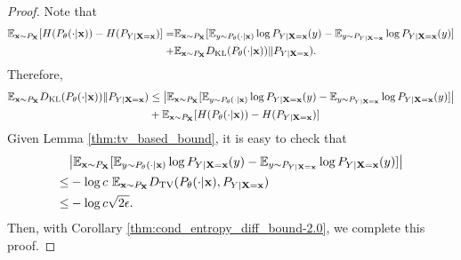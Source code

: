 \begin{proof}
Note that
\begin{equation*}
\begin{split}
    \mathbb{E}_{\mathbf{x}\sim P_{\mathbf{X}}} [ H( P_{\theta}(\cdot|\mathbf{x})) - H(P_{Y|\mathbf{X}=\mathbf{x}})] = & \mathbb{E}_{\mathbf{x}\sim P_{\mathbf{X}}} [\mathbb{E}_{y\sim P_{\theta}(\cdot|\mathbf{x})}\log P_{Y|\mathbf{X}=\mathbf{x}}(y) -\mathbb{E}_{y\sim P_{Y|\mathbf{X}=\mathbf{x}}} \log P_{Y|\mathbf{X}=\mathbf{x}}(y) ] \\ 
    +& {\mathbb{E}_{\mathbf{x}\sim P_{\mathbf{X}}} D_{\rm KL}(P_{\theta}(\cdot|\mathbf{x}))} \| P_{Y|\mathbf{X}=\mathbf{x}}).
    \end{split}
\end{equation*}
Therefore,
\begin{equation*}
\begin{split}
   {\mathbb{E}_{\mathbf{x}\sim P_{\mathbf{X}}} D_{\rm KL}(P_{\theta}(\cdot|\mathbf{x}))} \| P_{Y|\mathbf{X}=\mathbf{x}})
   &\leq \big |  \mathbb{E}_{\mathbf{x}\sim P_{\mathbf{X}}} [\mathbb{E}_{y\sim P_{\theta}(\cdot|\mathbf{x})}\log P_{Y|\mathbf{X}=\mathbf{x}}(y) -\mathbb{E}_{y\sim P_{Y|\mathbf{X}=\mathbf{x}}} \log P_{Y|\mathbf{X}=\mathbf{x}}(y) ] \big | \\
   &+ \mathbb{E}_{\mathbf{x}\sim P_{\mathbf{X}}} [ H( P_{\theta}(\cdot|\mathbf{x})) - H(P_{Y|\mathbf{X}=\mathbf{x}})]
    \end{split}
\end{equation*}
Given Lemma \ref{thm:tv_based_bound}, it is easy to check that
\begin{equation*}
    \begin{split}
        &\big |  \mathbb{E}_{\mathbf{x}\sim P_{\mathbf{X}}} [\mathbb{E}_{y\sim P_{\theta}(\cdot|\mathbf{x})}\log P_{Y|\mathbf{X}=\mathbf{x}}(y) -\mathbb{E}_{y\sim P_{Y|\mathbf{X}=\mathbf{x}}} \log P_{Y|\mathbf{X}=\mathbf{x}}(y) ] \big |
        \\ \leq &- \log c ~ \mathbb{E}_{\mathbf{x}\sim P_{\mathbf{X}}} D_{\rm TV}(P_{\theta}(\cdot|\mathbf{x}), P_{Y|\mathbf{X}=\mathbf{x}})
        \\ \leq & - \log c \sqrt{2\epsilon}.
    \end{split}
\end{equation*}
Then, with Corollary \ref{thm:cond_entropy_diff_bound-2.0}, we complete this proof.
\end{proof}





















